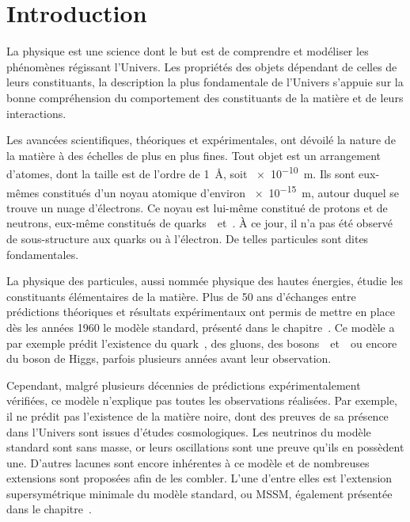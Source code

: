\chapter*{Introduction}\label{chapter-introduction}

La physique est une science dont le but est de
comprendre et modéliser les phénomènes régissant l'Univers.
Les propriétés des objets dépendant de celles de leurs constituants,
la description la plus fondamentale de l'Univers s'appuie sur la bonne compréhension
du comportement des constituants de la matière et de leurs interactions.
\par
Les avancées scientifiques, théoriques et expérimentales,
ont dévoilé la nature de la matière à des échelles de plus en plus fines.
Tout objet est un arrangement d'atomes, dont la taille est de l'ordre de
\SI{1}{\angstrom}, soit \SI{e-10}{\meter}.
Ils sont eux-mêmes constitués d'un noyau atomique d'environ \SI{e-15}{\meter},
autour duquel se trouve un nuage d'électrons.
Ce noyau est lui-même constitué de protons et de neutrons,
eux-même constitués de quarks~\quarku\ et~\quarkd.
À ce jour, il n'a pas été observé de sous-structure aux quarks ou à l'électron.
De telles particules sont dites fondamentales.
\par
La physique des particules, aussi nommée physique des hautes énergies, étudie les constituants élémentaires de la matière.
Plus de 50 ans d'échanges entre prédictions théoriques et résultats expérimentaux
ont permis de mettre en place dès les années 1960 le modèle standard,
présenté dans le chapitre~.
Ce modèle a par exemple prédit l'existence
du quark~\quarkt,
des gluons,
des bosons~\Wboson\ et~\Zboson\
ou encore
du boson de Higgs,
parfois plusieurs années avant leur observation.
\par
Cependant,
malgré plusieurs décennies de prédictions expérimentalement vérifiées,
ce modèle n'explique pas toutes les observations réalisées.
Par exemple,
il ne prédit pas l'existence de la matière noire,
dont des preuves de sa présence dans l'Univers
sont issues d'études cosmologiques.
Les neutrinos du modèle standard sont sans masse,
or 
leurs oscillations sont une preuve qu'ils en possèdent une.
D'autres lacunes sont encore inhérentes à ce modèle
et
de nombreuses extensions sont proposées afin de les combler.
L'une d'entre elles est l'extension supersymétrique minimale du modèle standard, ou MSSM,
également présentée dans le chapitre~\refChMSSM.
